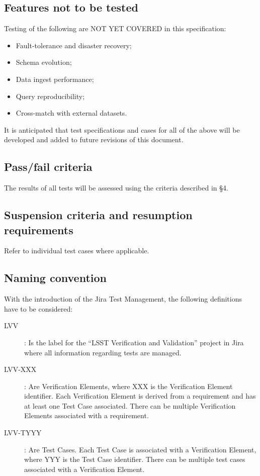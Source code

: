 \documentclass[DM,lsstdraft,STS,toc]{lsstdoc}
\begin{document}
\subsection{Features not to be tested}
\label{sec:featnot2test}

Testing of the following are NOT YET COVERED in this specification:

\begin{itemize}
  \item{Fault-tolerance and disaster recovery;}
  \item{Schema evolution;}
  \item{Data ingest performance;}
  \item{Query reproducibility;}
  \item{Cross-match with external datasets.}
\end{itemize}

It is anticipated that test specifications and cases for all of the above will be developed
and added to future revisions of this document.

\subsection{Pass/fail criteria}
\label{sec:passfail}

The results of all tests will be assessed using the criteria described in  \S4.

\subsection{Suspension criteria and resumption requirements}
\label{suspension}

Refer to individual test cases where applicable.

\subsection{Naming convention}

With the introduction of the Jira Test Management, the following definitions have to be considered:

\begin{description}
  \item[LVV]{: Is the label for the ``LSST Verification and Validation'' project in Jira where all information regarding tests are managed.}
  \item[LVV-XXX]{: Are Verification Elements, where XXX is the Verification Element identifier.  Each Verification Element is derived from a requirement and has at least one Test Case associated. There can be multiple Verification Elements associated with a requirement.}
  \item[LVV-TYYY]{: Are Test Cases. Each Test Case is associated with a Verification Element, where YYY is the Test Case identifier. There can be multiple test cases associated with a Verification Element.}
\end{description}
\end{document}
